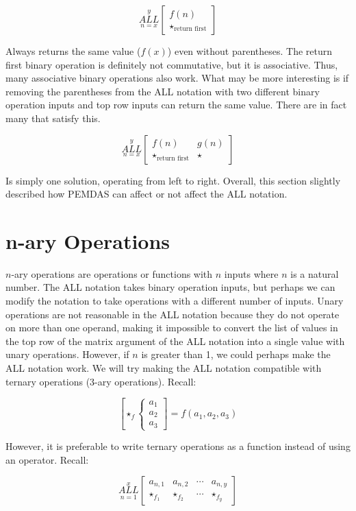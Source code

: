 \documentclass{article}
\begin{document}
$$\underset{n=x}{\overset{y}{ALL}}
\begin{bmatrix}
f(n) \\
\star_{\text{return first}}
\end{bmatrix}$$

Always returns the same value ($f(x)$) even without parentheses. The return first binary operation is definitely not commutative, but it is associative. Thus, many associative binary operations also work. What may be more interesting is if removing the parentheses from the ALL notation with two different binary operation inputs and top row inputs can return the same value. There are in fact many that satisfy this.

$$\underset{n=x}{\overset{y}{ALL}}
\begin{bmatrix}
f(n) & g(n) \\
\star_{\text{return first}} & \star
\end{bmatrix}$$

Is simply one solution, operating from left to right. Overall, this section slightly described how PEMDAS can affect or not affect the ALL notation.

\section{n-ary Operations}

$n$-ary operations are operations or functions with $n$ inputs where $n$ is a natural number. The ALL notation takes binary operation inputs, but perhaps we can modify the notation to take operations with a different number of inputs. Unary operations are not reasonable in the ALL notation because they do not operate on more than one operand, making it impossible to convert the list of values in the top row of the matrix argument of the ALL notation into a single value with unary operations. However, if $n$ is greater than 1, we could perhaps make the ALL notation work. We will try making the ALL notation compatible with ternary operations (3-ary operations). Recall:

$$\left[ \star_f \left\{ \begin{array}{rcl}
a_1 \\ a_2 \\ a_3 \end{array}\right. \right] = f(a_1,a_2,a_3)$$

However, it is preferable to write ternary operations as a function instead of using an operator. Recall:

$$\underset{n=1}{\overset{x}{ALL}} \begin{bmatrix}
a_{n,1} & a_{n,2} & \cdots & a_{n,y} \\
\star_{f_1} & \star_{f_2} & \cdots & \star_{f_y}
\end{bmatrix}$$
\end{document}
